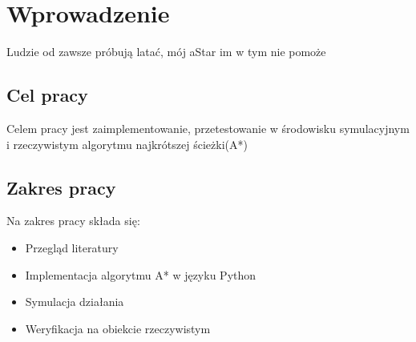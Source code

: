 \section{Wprowadzenie }
Ludzie od zawsze próbują latać, mój aStar im w tym nie pomoże 


\subsection{Cel pracy}
Celem pracy jest zaimplementowanie, przetestowanie w środowisku symulacyjnym i rzeczywistym algorytmu najkrótszej ścieżki(A*)


\subsection{Zakres pracy}
Na zakres pracy składa się:
\begin{itemize}
    \item Przegląd literatury
    \item Implementacja algorytmu A* w języku Python
    \item Symulacja działania
    \item Weryfikacja na obiekcie rzeczywistym
\end{itemize}
